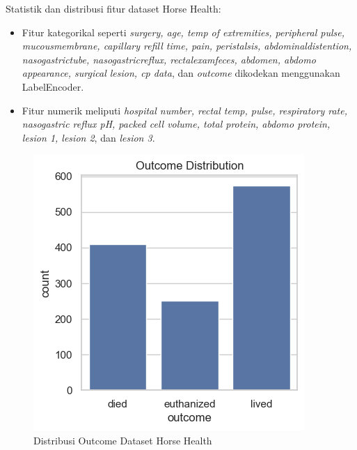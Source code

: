 \documentclass[conference]{IEEEtran}
\begin{document}
Statistik dan distribusi fitur dataset Horse Health:
\begin{itemize}
    \item Fitur kategorikal seperti \textit{surgery, age, temp of extremities, peripheral pulse, mucousmembrane, capillary refill time, pain, peristalsis, abdominaldistention, nasogastrictube, nasogastricreflux, rectalexamfeces, abdomen, abdomo appearance, surgical lesion, cp data}, dan \textit{outcome} dikodekan menggunakan LabelEncoder.
    \item Fitur numerik meliputi \textit{hospital number, rectal temp, pulse, respiratory rate, nasogastric reflux pH, packed cell volume, total protein, abdomo protein, lesion 1, lesion 2}, dan \textit{lesion 3}.
\end{itemize}

\begin{figure}[htbp]
    \centerline{\includegraphics[width=\linewidth, scale=0.5]{horse_distribution.png}}
    \caption{Distribusi Outcome Dataset Horse Health}
    \label{horse_distribution}
\end{figure}
\end{document}
